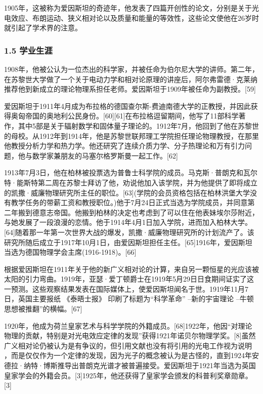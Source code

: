 1905年，这被称为爱因斯坦的奇迹年，他发表了四篇开创性的论文，分别是关于光电效应、布朗运动、狭义相对论以及质量和能量的等效性，这些论文使他在26岁时就引起了学术界的注意。

\subsubsection{1.5 学业生涯}
1908年，他被公认为一位杰出的科学家，并被任命为伯尔尼大学的讲师。第二年，在苏黎世大学做了一个关于电动力学和相对论原理的讲座后，阿尔弗雷德·克莱纳推荐他到新成立的理论物理系担任老师。爱因斯坦于1909年被任命为副教授。[59]

爱因斯坦于1911年4月成为布拉格的德国查尔斯-费迪南德大学的正教授，并因此获得奥匈帝国的奥地利公民身份。[60][61]在布拉格逗留期间，他写了11部科学著作，其中5部是关于辐射数学和固体量子理论的。1912年7月，他回到了他在苏黎世的母校。从1912年到1914年，他是苏黎世联邦理工学院担任理论物理教授，在那里他教授分析力学和热力学。他还研究了连续介质力学、分子热理论和万有引力问题，他与数学家兼朋友的马塞尔格罗斯曼一起工作。[62]

1913年7月3日，他在柏林被投票选为普鲁士科学院的成员。马克斯·普朗克和瓦尔特·能斯特第二周在苏黎士拜访了他，劝说他加入该学院，并为他提供了即将成立的凯撒·威廉物理研究所主任的职位。[63](学院的会员资格包括在柏林洪堡大学没有教学任务的带薪工资和教授职位。)他于7月24日正式当选为学院成员，并同意第二年搬到德意志帝国。他搬到柏林的决定也考虑到了可以住在他表妹埃尔莎附近，与她发展了一段浪漫的恋情。他于1914年4月1日加入学院，进而加入柏林大学。[64]随着那一年第一次世界大战的爆发，凯撒·威廉物理研究所的计划流产了。该研究所随后成立于1917年10月1日，由爱因斯坦担任主任。[65]1916年，爱因斯坦当选为德国物理学会主席(1916-1918)。[66]

根据爱因斯坦在1911年关于他的新广义相对论的计算，来自另一颗恒星的光应该被太阳的引力弯曲。1919年，亚瑟·爱丁顿爵士在1919年5月29日日食期间证实了这一预测。这些观察结果发表在国际媒体上，使爱因斯坦闻名于世。1919年11月7日，英国主要报纸 《泰晤士报》 印刷了标题为“科学革命” –新的宇宙理论 –牛顿思想被推翻”的横幅。[67]

1920年，他成为荷兰皇家艺术与科学学院的外籍成员。[68]1922年，他因“对理论物理的贡献，特别是对光电效应定律的发现”获得1921年诺贝尔物理学奖。[8]虽然广义相对论仍被认为是有争议的，但引用文献也没有将引用的光电工作视为说明 ，而是仅仅作为一个定律的发现，因为光子的概念被认为是古怪的，直到1924年安德拉·纳特·博斯推导出普朗克光谱才被普遍接受。爱因斯坦于1921年当选为英国皇家学会的外籍会员。[3]1925年，他还获得了皇家学会颁发的科普利奖章勋章。[3]

